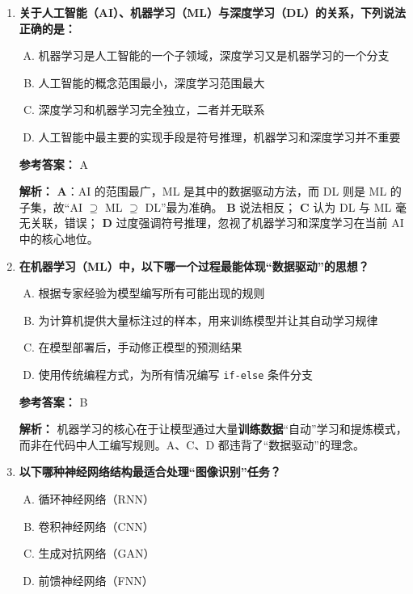 \begin{enumerate}
  \item \textbf{关于人工智能（AI）、机器学习（ML）与深度学习（DL）的关系，下列说法正确的是：}
  \begin{enumerate}[A.]
    \item 机器学习是人工智能的一个子领域，深度学习又是机器学习的一个分支
    \item 人工智能的概念范围最小，深度学习范围最大
    \item 深度学习和机器学习完全独立，二者并无联系
    \item 人工智能中最主要的实现手段是符号推理，机器学习和深度学习并不重要
  \end{enumerate}

  \textbf{参考答案：} A

  \textbf{解析：}  
  \textbf{A}：AI 的范围最广，ML 是其中的数据驱动方法，而 DL 则是 ML 的子集，故“AI $\supseteq$ ML $\supseteq$ DL”最为准确。  
  \textbf{B} 说法相反； \textbf{C} 认为 DL 与 ML 毫无关联，错误； \textbf{D} 过度强调符号推理，忽视了机器学习和深度学习在当前 AI 中的核心地位。

  \item \textbf{在机器学习（ML）中，以下哪一个过程最能体现“数据驱动”的思想？}
  \begin{enumerate}[A.]
    \item 根据专家经验为模型编写所有可能出现的规则
    \item 为计算机提供大量标注过的样本，用来训练模型并让其自动学习规律
    \item 在模型部署后，手动修正模型的预测结果
    \item 使用传统编程方式，为所有情况编写 \texttt{if-else} 条件分支
  \end{enumerate}

  \textbf{参考答案：} B

  \textbf{解析：}  
  机器学习的核心在于让模型通过大量\textbf{训练数据}“自动”学习和提炼模式，而非在代码中人工编写规则。A、C、D 都违背了“数据驱动”的理念。

  \item \textbf{以下哪种神经网络结构最适合处理“图像识别”任务？}
  \begin{enumerate}[A.]
    \item 循环神经网络（RNN）
    \item 卷积神经网络（CNN）
    \item 生成对抗网络（GAN）
    \item 前馈神经网络（FNN）
  \end{enumerate}


\end{enumerate}
